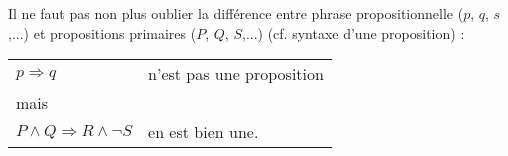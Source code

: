 			Il ne faut pas non plus oublier la différence entre phrase propositionnelle ($p$, $q$, $s$,...) et propositions primaires ($P$, $Q$, $S$,...) (cf. syntaxe d'une proposition) :
			\begin{center}
			\begin{tabular}{ll}
				$p \Rightarrow q$ & n'est pas une proposition\\
				
				mais &\\
				$P \land Q \Rightarrow R \land \lnot S$ & en est bien une.\\
			\end{tabular}
			\end{center}
	
